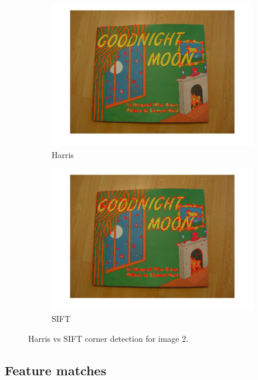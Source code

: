 \documentclass[paper=a4, fontsize=11pt]{scrartcl} %
\numberwithin{equation}{section} %
\numberwithin{figure}{section} %
\numberwithin{table}{section} %
\begin{document}
\begin{figure}
\centering
\begin{subfigure}{.5\textwidth}
  \centering
  \includegraphics[width=1\linewidth]{im2_harris_corners.jpg}
  \caption{Harris}
\end{subfigure}%
\begin{subfigure}{.5\textwidth}
  \centering
  \includegraphics[width=1\linewidth]{img2_sift_corners.jpg}
  \caption{SIFT}
\end{subfigure}
\caption{Harris vs SIFT corner detection for image 2.}
\label{fig:sift2}
\end{figure}


\subsection{Feature matches}
\end{document}
